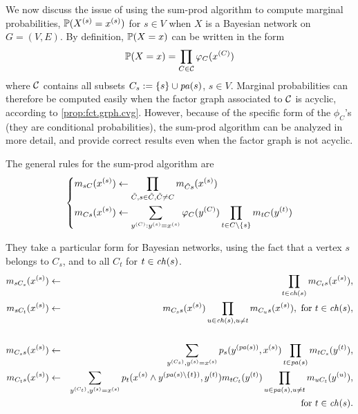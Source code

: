 We now discuss the issue of using the sum-prod algorithm to compute marginal probabilities,
$\bm{\mathbb P}(X^{(s)} = x^{(s)})$ for $s\in V$ when $X$ is a Bayesian network on $G =
(V,E)$. By definition, $\bm{\mathbb P}(X = x)$ can be written in the form
$$
\bm{\mathbb P}(X=x) = \prod_{C\in{\mathcal C}} \varphi_C(x^{(C)})
$$
where ${\mathcal C}$ contains all subsets $C_s := \left\{ s \right\} \cup {\mathit{pa}(s)}$, $s\in
V$. Marginal probabilities can therefore be computed easily when the
factor graph associated to ${\mathcal C}$ is acyclic, according to 
\cref{prop:fct.grph.cvg}.  However, because of the specific form of the $\phi_C$'s (they are
conditional probabilities), the sum-prod algorithm can be analyzed
in more detail, and provide correct results even when the factor graph
is not acyclic.

The general rules for the sum-prod algorithm are
\[
\left\{
\begin{aligned}
&m_{sC}(x^{(s)}) \leftarrow \prod_{\tilde C, s\in \tilde C,  \tilde C\neq C} m_{\tilde C s}(x^{(s)})\\
&m_{Cs}(x^{(s)}) \leftarrow \sum_{y^{(C)}: y^{(s)} = x^{(s)}} \varphi_C(y^{(C)}) \prod_{t\in C\setminus \{s\}} m_{tC}(y^{(t)})
\end{aligned}
\right.
\]

They take a particular form for Bayesian networks, using the fact that a vertex $s$ belongs to $C_s$, and to
all $C_t$ for $t\in {\mathit{ch}(s)}$.
\begin{eqnarray*}
m_{sC_s}(x^{(s)}) &\leftarrow& \prod_{t\in {\mathit{ch}(s)}} m_{C_ts}(x^{(s)}),\\
m_{sC_t}(x^{(s)}) &\leftarrow& m_{C_ss}(x^{(s)}) \prod_{u\in {\mathit{ch}(s)}, u\neq t}
m_{C_us}(x^{(s)}), \text{ for } t\in {\mathit{ch}(s)},\\
&&\\
m_{C_ss}(x^{(s)}) &\leftarrow& \sum_{y^{(C_s)}, y^{(s)} = x^{(s)}} p_s(y^{({\mathit{pa}(s)})}, x^{(s)}) \prod_{t\in
{\mathit{pa}(s)}} m_{tC_s}(y^{(t)}),\\
m_{C_ts}(x^{(s)}) &\leftarrow& \sum_{y^{(C_t)}, y^{(s)} = x^{(s)}} p_t(x^{(s)}\wedge y^{({\mathit{pa}(s)}\setminus\{t\})}, y^{(t)}) m_{tC_t}(y^{(t)}) \prod_{u\in
{\mathit{pa}(s)}, u\neq t} m_{uC_t}(y^{(u)}), 
\\ && \text{ for } t\in {\mathit{ch}(s)}.
\end{eqnarray*}

